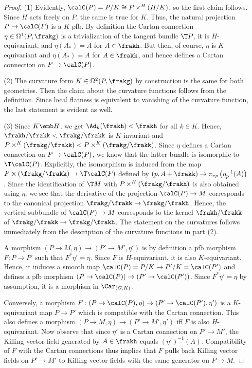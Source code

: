 \begin{proof}
    (1) Evidently, $\calC(P)=P\slash K\cong P\times^H (H\slash K)$, so the first claim follows. Since $H$ acts freely on $P$, the same is true for $K$. Thus, the natural projection $P\to \calC(P)$ is a $K$-\gls{pfb}. By definition the Cartan connection $\eta\in\Omega^1(P,\frakg)$ is a trivialization of the tangent bundle $\T P$, it is $H$-equivariant, and $\eta(A_\ast)=A$ for $A\in\frakh$. But then, of course, $\eta$ is $K$-equivariant and $\eta(A_\ast)=A$ for $A\in\frakk$, and hence defines a Cartan connection on $P\to \calC(P)$.

    (2) The curvature form $K\in \Omega^2(P,\frakg)$ by construction is the same for both geometries. Then the claim about the curvature functions follows from the definition. Since local flatness is equivalent to vanishing of the curvature function, the last statement is evident as well.

    (3) Since $K\emb H$, we get $\Ad_k(\frakh)<\frakh$ for all $k\in K$. Hence, $\frakh\slash\frakk<\frakg\slash\frakk$ is $K$-invariant and $P\times^K (\frakg\slash \frakk)<P\times^K (\frakg\slash\frakk)$. Since $\eta$ defines a Cartan connection on $P\to \calC(P)$, we know that the latter bundle is isomorphic to $\T\calC(P)$. Explicitly, the isomorphism is induced from the map $P\times (\frakg\slash\frakk)\to \T\calC(P)$ defined by $(p,A+\frakk)\to \pi_{\ast p}\left(\eta_p^{-1}(A)\right)$. Since the identification of $\T M$ with $P\times^H(\frakg\slash\frakh)$ is also obtained using $\eta$, we see that the derivative of the projection $\calC(P)\to M$ corresponds to the canonical projection $\frakg\slash\frakk\to \frakg\slash\frakh$. Hence, the vertical subbundle of $\calC(P)\to M$ corresponds to the kernel $\frakh\slash\frakk$ of $\frakg\slash\frakk\to \frakg\slash\frakh$. The statement on the curvatures follows immediately from the description of the curvature functions in part (2).

    \item A morphism $(P\to M,\eta)\to (P'\to M',\eta')$ is by definition a \gls{pfb} morphism $F:P\to P'$ such that $F^\ast \eta'=\eta$. Since $F$ is $H$-equivariant, it is also $K$-equivariant. Hence, it induces a smooth map $\calC(P)=P\slash K\to P'\slash K=\calC(P')$ and defines a \gls{pfb} morphism $(P\to \calC(P))\to (P'\to \calC(P'))$. Since $F^\ast\eta'=\eta$ by assumption, it is a morphism in $\Car_{(G,K)}$.
    
    Conversely, a morphism $F:(P\to \calC(P),\eta)\to (P'\to\calC(P'),\eta')$ is a $K$-equivariant map $P\to P'$ which is compatible with the Cartan connection. This also defines a morphism $(P\to M,\eta)\to (P'\to M',\eta')$ iff $F$ is also $H$-equivariant. Now observe that since $\eta'$ is a Cartan connection on $P'\to M'$, the Killing vector field generated by $A\in\frakh$ equals $(\eta')^{-1}(A)$. Compatibility of $F$ with the Cartan connections thus implies that $F$ pulls back Killing vector fields on $P'\to M'$ to Killing vector fields with the same generator on $P\to M$.


\end{proof}
